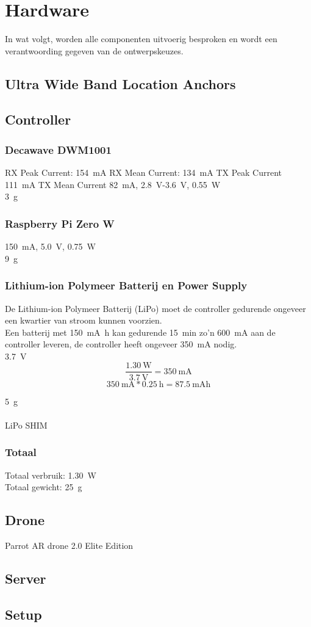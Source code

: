 \chapter{Hardware}
In wat volgt, worden alle componenten uitvoerig besproken en wordt een verantwoording gegeven van de ontwerpskeuzes.

\section{Ultra Wide Band Location Anchors}  \label{sec:uwb_location_anchors}


\section{Controller} \label{sec:controller}
\subsection{Decawave DWM1001}  \label{sec:decawave}
RX Peak Current: \SI{154}{\mA} RX Mean Current: \SI{134}{\mA} TX Peak Current \SI{111}{\mA} TX Mean Current \SI{82}{mA}, \SI{2.8}{\V}-\SI{3.6}{\V}, \SI{0.55}{\W}\\
\SI{3}{\g}

\subsection{Raspberry Pi Zero W} \label{sec:raspberry_pi}
\SI{150}{\mA}, \SI{5.0}{\V}, \SI{0.75}{\W}\\
\SI{9}{\g}

\subsection{Lithium-ion Polymeer Batterij en Power Supply} \label{sec:lipo}
De Lithium-ion Polymeer Batterij (LiPo) moet de controller gedurende ongeveer een kwartier van stroom kunnen voorzien.\\
Een batterij met \SI{150}{\mA\hour} kan gedurende \SI{15}{\minute} zo'n \SI{600}{\mA} aan de controller leveren, de controller heeft ongeveer \SI{350}{\mA} nodig.\\
\SI{3.7}{\V}\\
\[\frac{\SI{1.30}{\W}}{\SI{3.7}{\V}}=\SI{350}{\mA}\]
\[\SI{350}{\mA}*\SI{0.25}{\hour}=\SI{87.5}{\mA\hour}\]

\SI{5}{\g}\\
\\
LiPo SHIM

\subsection{Totaal} \label{sec:totaal}
Totaal verbruik: \SI{1.30}{\W}\\
Totaal gewicht: \SI{25}{\g}

\section{Drone} \label{sec:drone}
Parrot AR drone 2.0 Elite Edition

\section{Server} \label{sec:server}


\section{Setup} \label{sec:setup}
